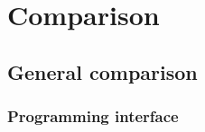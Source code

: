 
\section{Comparison}\label{sec:numer}

\subsection{General comparison}



\begin{frame}
  \MyLogo
  \frametitle{Programming interface}  
  


\end{frame}
